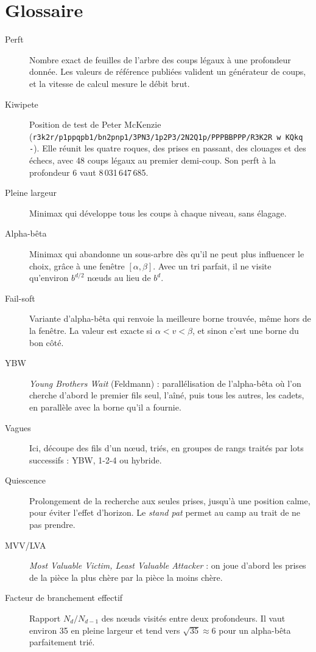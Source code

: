 \documentclass[11pt,a4paper]{article}
\newcommand{\code}[1]{\texttt{#1}}
\begin{document}
\section{Glossaire}
\begin{description}
\item[Perft] Nombre exact de feuilles de l'arbre des coups légaux à une profondeur donnée. Les
valeurs de référence publiées valident un générateur de coups, et la vitesse de calcul mesure le
débit brut.
\item[Kiwipete] Position de test de Peter McKenzie
(\code{r3k2r/\allowbreak p1ppqpb1/\allowbreak bn2pnp1/\allowbreak 3PN3/\allowbreak 1p2P3/\allowbreak 2N2Q1p/\allowbreak PPPBBPPP/\allowbreak R3K2R w KQkq -}). Elle réunit les quatre
roques, des prises en passant, des clouages et des échecs, avec 48 coups légaux au premier
demi-coup. Son perft à la profondeur 6 vaut 8\,031\,647\,685.
\item[Pleine largeur] Minimax qui développe tous les coups à chaque niveau, sans élagage.
\item[Alpha-bêta] Minimax qui abandonne un sous-arbre dès qu'il ne peut plus influencer le choix,
grâce à une fenêtre $[\alpha,\beta]$. Avec un tri parfait, il ne visite qu'environ $b^{d/2}$
nœuds au lieu de $b^d$.
\item[Fail-soft] Variante d'alpha-bêta qui renvoie la meilleure borne trouvée, même hors de la
fenêtre. La valeur est exacte si $\alpha<v<\beta$, et sinon c'est une borne du bon côté.
\item[YBW] \emph{Young Brothers Wait} (Feldmann) : parallélisation de l'alpha-bêta où l'on
cherche d'abord le premier fils seul, l'aîné, puis tous les autres, les cadets, en parallèle avec
la borne qu'il a fournie.
\item[Vagues] Ici, découpe des fils d'un nœud, triés, en groupes de rangs traités par lots
successifs : YBW, 1-2-4 ou hybride.
\item[Quiescence] Prolongement de la recherche aux seules prises, jusqu'à une position calme, pour
éviter l'effet d'horizon. Le \emph{stand pat} permet au camp au trait de ne pas prendre.
\item[MVV/LVA] \emph{Most Valuable Victim, Least Valuable Attacker} : on joue d'abord les prises
de la pièce la plus chère par la pièce la moins chère.
\item[Facteur de branchement effectif] Rapport $N_d/N_{d-1}$ des nœuds visités entre deux
profondeurs. Il vaut environ 35 en pleine largeur et tend vers $\sqrt{35}\approx6$ pour un
alpha-bêta parfaitement trié.
\end{description}
\end{document}
